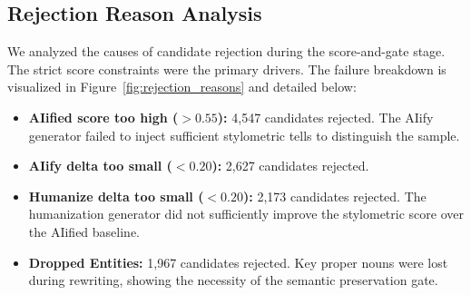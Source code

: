 \documentclass{article}
\begin{document}
\begin{table}[htbp]
\centering
\caption{Domain-specific dataset breakdown, showing seed count, accepted count, mean scores, and deltas.}
\label{tab:domain}
\end{table}

\subsection{Rejection Reason Analysis}
We analyzed the causes of candidate rejection during the score-and-gate stage. The strict score constraints were the primary drivers. The failure breakdown is visualized in Figure~\ref{fig:rejection_reasons} and detailed below:
\begin{itemize}
    \item \textbf{AIified score too high ($>0.55$):} 4,547 candidates rejected. The AIify generator failed to inject sufficient stylometric tells to distinguish the sample.
    \item \textbf{AIify delta too small ($<0.20$):} 2,627 candidates rejected.
    \item \textbf{Humanize delta too small ($<0.20$):} 2,173 candidates rejected. The humanization generator did not sufficiently improve the stylometric score over the AIified baseline.
    \item \textbf{Dropped Entities:} 1,967 candidates rejected. Key proper nouns were lost during rewriting, showing the necessity of the semantic preservation gate.
\end{itemize}
\end{document}
